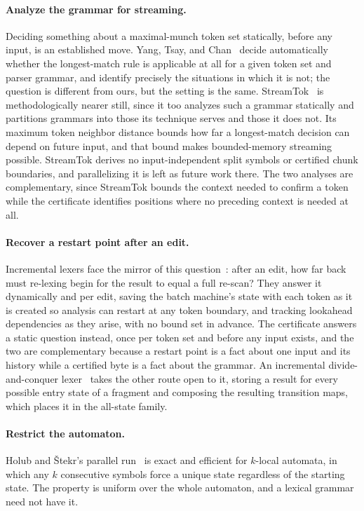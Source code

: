 \documentclass[11pt,a4paper]{article}
\theoremstyle{definition}
\theoremstyle{plain}
\begin{document}
\paragraph{Analyze the grammar for streaming.} Deciding something about a maximal-munch token set statically, before any
input, is an established move. Yang, Tsay, and Chan~\cite{yang2002longest} decide automatically whether the
longest-match rule is applicable at all for a given token set and parser grammar, and identify precisely the situations
in which it is not; the question is different from ours, but the setting is the same. StreamTok~\cite{li2026streaming}
is methodologically nearer still, since it too analyzes such a grammar statically and partitions grammars into those its
technique serves and those it does not. Its maximum token neighbor distance bounds how far a longest-match decision can
depend on future input, and that bound makes bounded-memory streaming possible. StreamTok derives no input-independent
split symbols or certified chunk boundaries, and parallelizing it is left as future work there. The two analyses are
complementary, since StreamTok bounds the context needed to confirm a token while the certificate identifies positions
where no preceding context is needed at all.

\paragraph{Recover a restart point after an edit.} Incremental lexers face the mirror of this
question~\cite{wagner1997lexing}: after an edit, how far back must re-lexing begin for the result to equal a full
re-scan? They answer it dynamically and per edit, saving the batch machine's state with each token as it is created so
analysis can restart at any token boundary, and tracking lookahead dependencies as they arise, with no bound set in
advance. The certificate answers a static question instead, once per token set and before any input exists, and the two
are complementary because a restart point is a fact about one input and its history while a certified byte is a fact
about the grammar. An incremental divide-and-conquer lexer~\cite{hugo2015incremental} takes the other route open to it,
storing a result for every possible entry state of a fragment and composing the resulting transition maps, which places
it in the all-state family.

\paragraph{Restrict the automaton.} Holub and \v{S}tekr's parallel run~\cite{holub2009parallel} is exact and efficient
for $k$-local automata, in which any $k$ consecutive symbols force a unique state regardless of the starting state. The
property is uniform over the whole automaton, and a lexical grammar need not have it.
\end{document}
